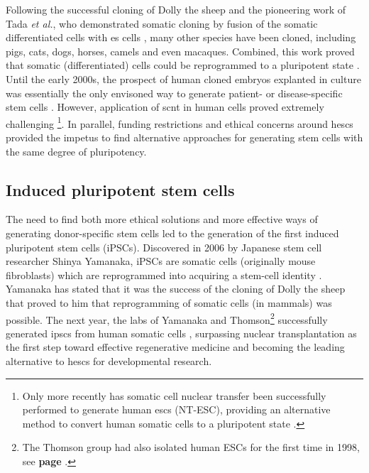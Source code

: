 Following the successful cloning of Dolly the sheep and the pioneering work of Tada \textit{et al.}, who demonstrated somatic cloning by fusion of the somatic differentiated cells with \gls{es} cells \cite{tada2001nuclear}, many other species have been cloned, including pigs, cats, dogs, horses, camels and even macaques.
Combined, this work proved that somatic (differentiated) cells could be reprogrammed to a pluripotent state \cite{cowan2005nuclear}.\\

Until the early 2000s, the prospect of human cloned embryos explanted in culture was essentially the only envisoned way to generate patient- or disease-specific stem cells \cite{yamanaka2007strategies}.
However, application of \gls{scnt} in human cells proved extremely challenging \cite{fulka2013ups}\footnote{Only more recently has somatic cell nuclear transfer been successfully performed to generate human \glspl{esc} (NT-ESC), providing an alternative method to convert human somatic cells to a pluripotent state \cite{tachibana2013human}.}. 
In parallel, funding restrictions and ethical concerns around \glspl{hesc} provided the impetus to find alternative approaches for generating stem cells with the same degree of pluripotency.

\subsection{Induced pluripotent stem cells}
\label{sec:ipsc}

The need to find both more ethical solutions and more effective ways of generating donor-specific stem cells  led to the generation of the first induced pluripotent stem cells (iPSCs).
Discovered in 2006 by Japanese stem cell researcher Shinya Yamanaka, iPSCs are somatic cells (originally mouse fibroblasts) which are reprogrammed into acquiring a stem-cell identity \cite{takahashi2006induction}.
Yamanaka has stated that it was the success of the cloning of Dolly the sheep that proved to him that reprogramming of somatic cells (in mammals) was possible.
The next year, the labs of Yamanaka and Thomson\footnote{The Thomson group had also isolated human ESCs for the first time in 1998, see \textbf{page \pageref{sec:esc_induction}}.} successfully generated \glspl{ipsc} from human somatic cells \cite{takahashi2006induction, takahashi2007induction, yu2007induced}, surpassing nuclear transplantation as the first step toward effective regenerative medicine and becoming the leading alternative to \glspl{hesc} for developmental research.\\

